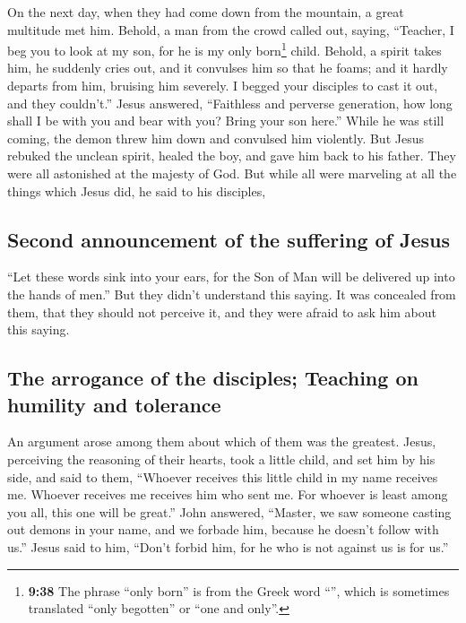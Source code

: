  On the next day, when they had come down from the
mountain, a great multitude met him.  Behold, a man from
the crowd called out, saying, ``Teacher, I beg you to look at my son,
for he is my only born\footnote{\textbf{9:38} The phrase ``only born''
  is from the Greek word ``'', which is sometimes
  translated ``only begotten'' or ``one and only''.} child.
 Behold, a spirit takes him, he suddenly cries out, and
it convulses him so that he foams; and it hardly departs from him,
bruising him severely.  I begged your disciples to cast
it out, and they couldn't.''  Jesus answered, ``Faithless
and perverse generation, how long shall I be with you and bear with you?
Bring your son here.''  While he was still coming, the
demon threw him down and convulsed him violently. But Jesus rebuked the
unclean spirit, healed the boy, and gave him back to his father.
 They were all astonished at the majesty of God. But
while all were marveling at all the things which Jesus did, he said to
his disciples,

\hypertarget{second-announcement-of-the-suffering-of-jesus}{%
\subsection{Second announcement of the suffering of
Jesus}\label{second-announcement-of-the-suffering-of-jesus}}

 ``Let these words sink into your ears, for the Son of
Man will be delivered up into the hands of men.''  But
they didn't understand this saying. It was concealed from them, that
they should not perceive it, and they were afraid to ask him about this
saying.

\hypertarget{the-arrogance-of-the-disciples-teaching-on-humility-and-tolerance}{%
\subsection{The arrogance of the disciples; Teaching on humility and
tolerance}\label{the-arrogance-of-the-disciples-teaching-on-humility-and-tolerance}}

 An argument arose among them about which of them was the
greatest.  Jesus, perceiving the reasoning of their
hearts, took a little child, and set him by his side, 
and said to them, ``Whoever receives this little child in my name
receives me. Whoever receives me receives him who sent me. For whoever
is least among you all, this one will be great.''  John
answered, ``Master, we saw someone casting out demons in your name, and
we forbade him, because he doesn't follow with us.'' 
Jesus said to him, ``Don't forbid him, for he who is not against us is
for us.''

